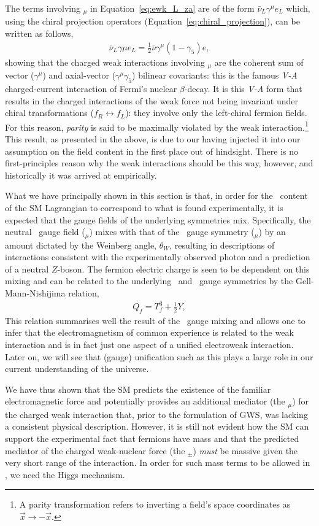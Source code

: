 The terms involving \fieldWpm$_{\mu}$ in Equation~\ref{eq:ewk_L_za} are
of the form $\bar{\nu}_L \gamma^{\mu} e_L$
which, using the chiral projection operators (Equation~\ref{eq:chiral_projection}), can be
written as follows,
\begin{align}
	\bar{\nu}_L \gamma{\mu} e_L = \frac{1}{2} \bar{\nu} \gamma^{\mu}(1-\gamma_5) e,
	\label{eq:v_minus_a}
\end{align}
showing that the charged weak interactions involving \fieldWpm$_{\mu}$ are the coherent
sum of vector ($\gamma^{\mu}$) and axial-vector ($\gamma^{\mu}\gamma_5$) bilinear covariants: this is the famous
\textit{V-A} charged-current interaction of Fermi's nuclear $\beta$-decay.
It is this \textit{V-A} form that results in the charged interactions of the weak force
not being invariant under chiral transformations ($f_R \leftrightarrow f_L$): they involve only
the left-chiral fermion fields. For this reason, \textit{parity}
is said to be maximally violated by the weak interaction.\footnote{A parity transformation
	refers to inverting a field's space coordinates as $\vec{x} \rightarrow -\vec{x}$.}
This result, as presented in the above, is due to our having injected
it into our assumption on the field content in the first place out of hindsight. There
is no first-principles reason why the weak interactions should be this way, however,
and historically it was arrived at empirically.

What we have principally shown in this section is that, in order for the \SUewk~content of
the SM Lagrangian to correspond to what is found experimentally, it is expected that
the gauge fields of the underlying symmetries mix. Specifically, the neutral \SUtwo~gauge field
(\fieldWzero$_{\mu}$) mixes with that of the \Uone~gauge symmetry (\fieldB$_{\mu}$) by an amount
dictated by the Weinberg angle, $\theta_W$, resulting in descriptions of interactions consistent
with the experimentally observed photon and a prediction of a neutral $Z$-boson. 
The fermion electric charge is seen to be dependent on this mixing
and can be related to the underlying \SUtwo~and \Uone~gauge symmetries by the
Gell-Mann-Nishijima relation,
\begin{align}
	Q_f = T_f^3 + \frac{1}{2}Y,
	\label{eq:gell_mann_nishijima}
\end{align}
This relation summarises well the result of the \SUewk~gauge mixing and allows one to
infer that the electromagnetism of common experience
is related to the weak interaction and is in fact just one aspect of a unified electroweak interaction.
Later on, we will see that (gauge) unification such as this plays a large role in our
current understanding of the universe.

We have thus shown that the SM predicts the existence of the familiar electromagnetic force
and potentially provides an additional mediator (the \fieldWpm$_{\mu}$) for the charged weak interaction that, prior to the
formulation of GWS, was lacking a consistent physical description. However, it is still
not evident how the SM can support the experimental fact that fermions have mass and that
the predicted mediator of the charged weak-nuclear force (the \fieldWpm$_{\pm}$) \textit{must}
be massive given the very short range of the interaction. In order for such mass terms to
be allowed in \SML, we need the Higgs mechanism.
